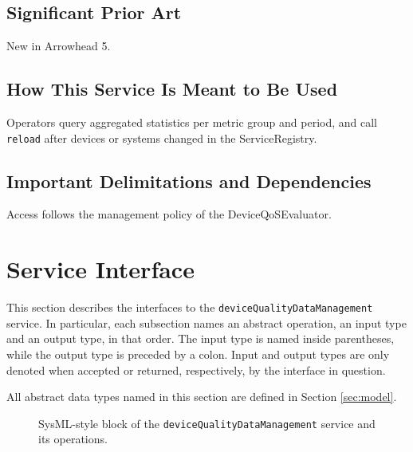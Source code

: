 \documentclass[a4paper]{arrowhead}
\begin{document}
\subsection{Significant Prior Art}

New in Arrowhead 5.

\subsection{How This Service Is Meant to Be Used}

Operators query aggregated statistics per metric group and period, and call \texttt{reload} after devices or systems changed in the ServiceRegistry.

\subsection{Important Delimitations and Dependencies}
\label{sec:delimitations}

Access follows the management policy of the Device\allowbreak{}Qo\allowbreak{}SEvaluator.

\newpage

\section{Service Interface}
\label{sec:operations}

This section describes the interfaces to the \texttt{device\allowbreak{}Quality\allowbreak{}Data\allowbreak{}Management} service.
In particular, each subsection names an abstract operation, an input type and an output type, in that order.
The input type is named inside parentheses, while the output type is preceded by a colon.
Input and output types are only denoted when accepted or returned, respectively, by the interface in question.

All abstract data types named in this section are defined in Section \ref{sec:model}.

\begin{figure}[ht!]
  \centering
  \caption{SysML-style block of the \texttt{device\allowbreak{}Quality\allowbreak{}Data\allowbreak{}Management} service and its operations.}
  \label{fig:SD}
\end{figure}
\end{document}
